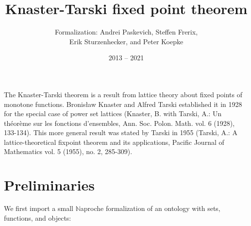 \documentclass{article}
\title{Knaster-Tarski fixed point theorem}
\author{\Naproche{} Formalization: Andrei Paskevich, Steffen Frerix,\\ Erik Sturzenhecker, and Peter Koepke}
\date{2013 -- 2021}
\begin{document}

  \maketitle

  The Knaster-Tarski theorem is a result from lattice theory about fixed points of monotone functions.
  Bronis\l aw Knaster and Alfred Tarski established it in 1928 for the special case of power set lattices
  (Knaster, B. with Tarski, A.: Un th\' eor\`eme sur les fonctions d'ensembles, Ann. Soc. Polon. Math.
  vol. 6 (1928), 133-134). This more general result was stated by Tarski in 1955 (Tarski, A.: A lattice-theoretical
  fixpoint theorem and its applications, Pacific Journal of Mathematics vol. 5 (1955), no. 2, 285-309).

  \section{Preliminaries}
We first import a small $\mathbb{N}$aproche formalization of an ontology with sets,
functions, and objects:
  \begin{forthel}
  \end{forthel}
\end{document}
